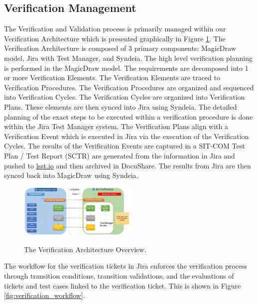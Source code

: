 \documentclass[SE,lsstdraft,authoryear,toc]{lsstdoc}
\begin{document}
\subsection{Verification Management}

The Verification and Validation process is primarily managed within our Verification Architecture which is presented graphically in Figure \ref{fig:verification_arch}.
The Verification Architecture is composed of 3 primary components: MagicDraw model, Jira with Test Manager, and Syndeia.
The high level verification planning is performed in the MagicDraw model.
The requirements are decomposed into 1 or more Verification Elements.
The Verification Elements are traced to Verification Procedures.
The Verification Procedures are organized and sequenced into Verification Cycles.
The Verification Cycles are organized into Verification Plans.
These elements are then synced into Jira using Syndeia.
The detailed planning of the exact steps to be executed within a verification procedure is done within the Jira Test Manager system.
The Verification Plans align with a Verification Event which is executed in Jira via the execution of the Verification Cycles.
The results of the Verification Events are captured in a SIT-COM Test Plan / Test Report (SCTR) are generated from the information in Jira and pushed to \href{https://lsst.io}{lsst.io} and then archived in DocuShare.
The results from Jira are then synced back into MagicDraw using Syndeia.

\begin{figure}[h]
    \centering
    \includegraphics[width=0.5\textwidth]{static/verification_architecture}
    \label{fig:verification_arch}
    \caption{The Verification Architecture Overview.}
\end{figure}

The workflow for the verification tickets in Jira enforces the verification process through transition conditions, transition validations, and the evaluations of tickets and test cases linked to the verification ticket.
This is shown in Figure \ref{fig:verification_workflow}.
\end{document}

